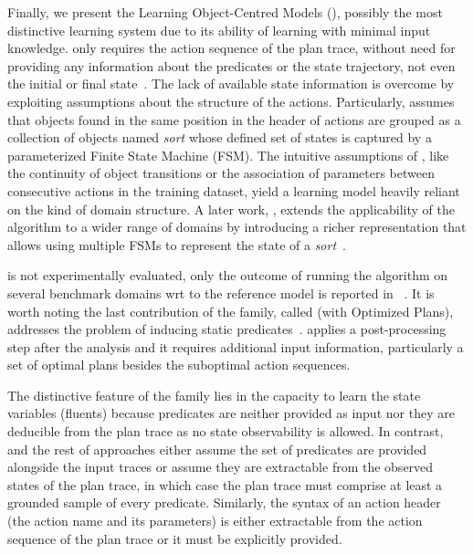 \vspace{0.15cm}


\textcolor[rgb]{1.00,0.00,0.00}{Finally, we present the Learning Object-Centred Models (\textbf{\LOCM}), possibly the most distinctive learning system due to its ability of learning with minimal input knowledge.} \textbf{\LOCM} only requires the \FO action sequence of the plan trace, without need for providing any information about the predicates or the state trajectory, not even the initial or final state~\cite{CresswellMW09,cresswell2013acquiring}. The lack of available state information is overcome by exploiting assumptions about the structure of the actions. Particularly, \LOCM assumes that objects found in the same position in the header of actions are grouped as a collection of objects \textcolor[rgb]{1.00,0.00,0.00}{named \emph{sort}} whose defined set of states is captured by a parameterized Finite State Machine (FSM). The intuitive assumptions of \LOCM, like the continuity of object transitions or the association of parameters between consecutive actions in the training dataset, yield a learning model heavily reliant on the kind of domain structure. A later work, \textbf{\LOCMtwo}, extends the applicability of the \LOCM algorithm to a wider range of domains by introducing a richer representation that allows using multiple FSMs to represent the state of a \emph{sort}~\cite{cresswell2011generalised}.

\LOCMtwo is not experimentally evaluated, only the outcome of running the \LOCMtwo algorithm on several benchmark domains wrt to the reference model is reported in ~\cite{cresswell2011generalised}. It is worth noting the last contribution of the \LOCM family, called \textbf{\LOP} (\LOCM with Optimized Plans), addresses the problem of inducing static predicates~\cite{GregoryC16}. \LOP applies a post-processing step after the \LOCM analysis and it requires additional input information, particularly a set of optimal plans besides the suboptimal \FO action sequences.

\textcolor[rgb]{1.00,0.00,0.00}{The distinctive feature of the \LOCM family lies in the capacity to learn the state variables (fluents) because predicates are neither provided as input nor they are deducible from the plan trace as no state observability is allowed. In contrast, \FAMA and the rest of approaches either assume the set of predicates are provided alongside the input traces or assume they are extractable from the observed states of the plan trace, in which case the plan trace must comprise at least a grounded sample of every predicate. Similarly, the syntax of an action header (the action name and its parameters) is either extractable from the action sequence of the plan trace or it must be explicitly provided.}

